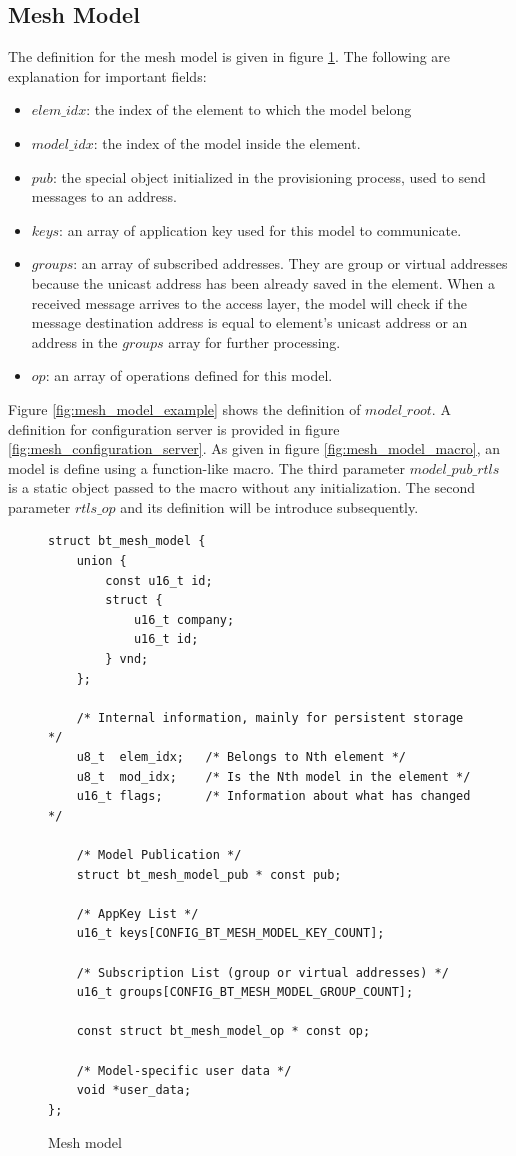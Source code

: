 \documentclass[\main/main.tex]{subfiles}
\begin{document}
\subsection{Mesh Model}
The definition for the mesh model is given in figure \ref{fig:mesh_model}. The following are explanation for important fields:
\begin{itemize}
    \item $elem\_idx$: the index of the element to which the model belong
    \item  $model\_idx$: the index of the model inside the element.
    \item $pub$: the special object initialized in the provisioning process, used to send messages to an address.
    \item $keys$: an array of application key used for this model to communicate.
    \item $groups$: an array of subscribed addresses. They are group or virtual addresses because the unicast address has been already saved in the element. When a received message arrives to the access layer, the model will check if the message destination address is equal to element's unicast address or an address in the $groups$ array for further processing.
    \item $op$: an array of operations defined for this model.
\end{itemize}
Figure \ref{fig:mesh_model_example} shows the definition of $model\_root$. A definition for configuration server is provided in figure \ref{fig:mesh_configuration_server}. As given in figure \ref{fig:mesh_model_macro}, an model is define using a function-like macro. The third parameter $model\_pub\_rtls$ is a static object passed to the macro without any initialization. The second parameter $rtls\_op$ and its definition will be introduce subsequently.
\begin{figure}[H]
    \begin{lstlisting}[style=CStyle]
struct bt_mesh_model {
    union {
        const u16_t id;
        struct {
            u16_t company;
            u16_t id;
        } vnd;
    };

    /* Internal information, mainly for persistent storage */
    u8_t  elem_idx;   /* Belongs to Nth element */
    u8_t  mod_idx;    /* Is the Nth model in the element */
    u16_t flags;      /* Information about what has changed */

    /* Model Publication */
    struct bt_mesh_model_pub * const pub;

    /* AppKey List */
    u16_t keys[CONFIG_BT_MESH_MODEL_KEY_COUNT];

    /* Subscription List (group or virtual addresses) */
    u16_t groups[CONFIG_BT_MESH_MODEL_GROUP_COUNT];

    const struct bt_mesh_model_op * const op;

    /* Model-specific user data */
    void *user_data;
};
    \end{lstlisting}
    \caption{Mesh model}
    \label{fig:mesh_model}
\end{figure}
\end{document}
